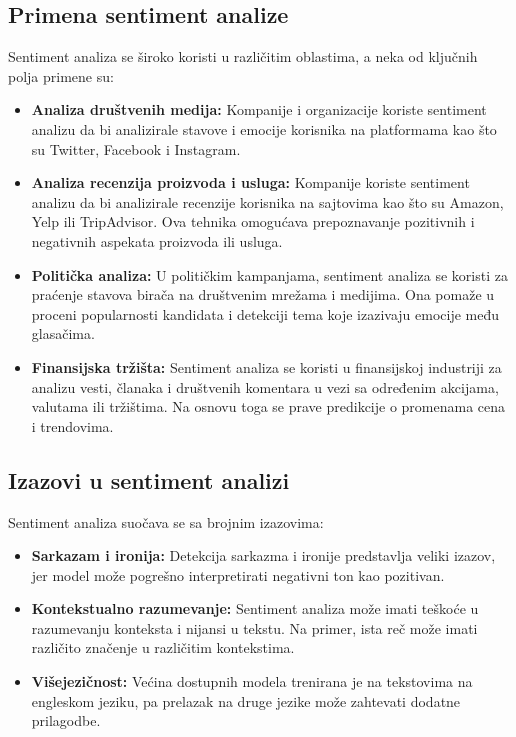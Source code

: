 \documentclass{article}
\begin{document}
\subsection{Primena sentiment analize}

Sentiment analiza se široko koristi u različitim oblastima, a neka od ključnih polja primene su:

\begin{itemize}
    \item \textbf{Analiza društvenih medija:} Kompanije i organizacije koriste sentiment analizu da bi analizirale stavove i emocije korisnika na platformama kao što su Twitter, Facebook i Instagram. 
    
    \item \textbf{Analiza recenzija proizvoda i usluga:} Kompanije koriste sentiment analizu da bi analizirale recenzije korisnika na sajtovima kao što su Amazon, Yelp ili TripAdvisor. Ova tehnika omogućava prepoznavanje pozitivnih i negativnih aspekata proizvoda ili usluga.
    
    \item \textbf{Politička analiza:} U političkim kampanjama, sentiment analiza se koristi za praćenje stavova birača na društvenim mrežama i medijima. Ona pomaže u proceni popularnosti kandidata i detekciji tema koje izazivaju emocije među glasačima.
    
    \item \textbf{Finansijska tržišta:} Sentiment analiza se koristi u finansijskoj industriji za analizu vesti, članaka i društvenih komentara u vezi sa određenim akcijama, valutama ili tržištima. Na osnovu toga se prave predikcije o promenama cena i trendovima.
    
\end{itemize}

\subsection{Izazovi u sentiment analizi}

Sentiment analiza suočava se sa brojnim izazovima:

\begin{itemize}
    \item \textbf{Sarkazam i ironija:} Detekcija sarkazma i ironije predstavlja veliki izazov, jer model može pogrešno interpretirati negativni ton kao pozitivan.
    
    \item \textbf{Kontekstualno razumevanje:} Sentiment analiza može imati teškoće u razumevanju konteksta i nijansi u tekstu. Na primer, ista reč može imati različito značenje u različitim kontekstima.
    
    \item \textbf{Višejezičnost:} Većina dostupnih modela trenirana je na tekstovima na engleskom jeziku, pa prelazak na druge jezike može zahtevati dodatne prilagodbe.
\end{itemize}
\end{document}
